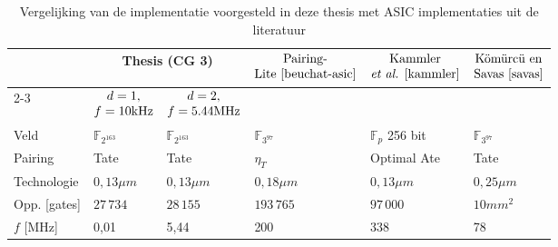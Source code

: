 \begin{table}[h]
	\caption{Vergelijking van de implementatie voorgesteld in deze thesis met ASIC implementaties uit de literatuur}
	\label{tabel-resultaten-asic}

	\begin{narrow}{-2cm}{-2cm}
		\centering
		\begin{tabular}{llllll}
			\toprule
			&	\multicolumn{2}{c}{Thesis (CG 3)\footnotemark[2]}	& \multirow{3}{*}{$\begin{array}{@{}c@{}}\text{Pairing-}\\\text{Lite \cite{beuchat-asic}}\end{array}$}	& \multicolumn{1}{c}{\multirow{3}{*}{$\begin{array}{@{}c@{}}\text{Kammler}\\\text{\emph{et al.} \cite{kammler}}\end{array}$}}	&  \multicolumn{1}{c}{\multirow{3}{*}{$\begin{array}{@{}c@{}}\text{K\"om\"urc\"u en}\\\text{Savas \cite{savas}}\end{array}$}}\\
			\cmidrule(r){2-3}
			& \multicolumn{1}{c}{$\begin{array}{@{}c@{}}d = 1,\\f = 10\text{kHz}\end{array}$} & \multicolumn{1}{c}{$\begin{array}{@{}c@{}}d = 2,\\f = 5.44\text{MHz}\end{array}$} & & &\\
	 		\midrule
			Veld																				& $\mathbb{F}_{2^{163}}$	& $\mathbb{F}_{2^{163}}$	& $\mathbb{F}_{3^{97}}$	& $\mathbb{F}_{p}$ 256 bit	& $\mathbb{F}_{3^{97}}$ \\
			Pairing																			& Tate							& Tate							& $\eta_T$					& Optimal Ate 					& Tate\\
			Technologie																		& $0,13 \mu m$					& $0,13 \mu m$					& $0,18 \mu m$				& $0,13 \mu m$					& $0,25 \mu m$\\
			Opp. [gates]																	& $27\,734$						& $28\,155$						& $193\,765$				& $97\,000$						& \emph{$10mm^2$}\footnotemark[3]\\
			$f$ [MHz]																		& 0,01							& 5,44							& 200							& 338								& 78\\

\end{tabular}
\end{narrow}
\end{table}
